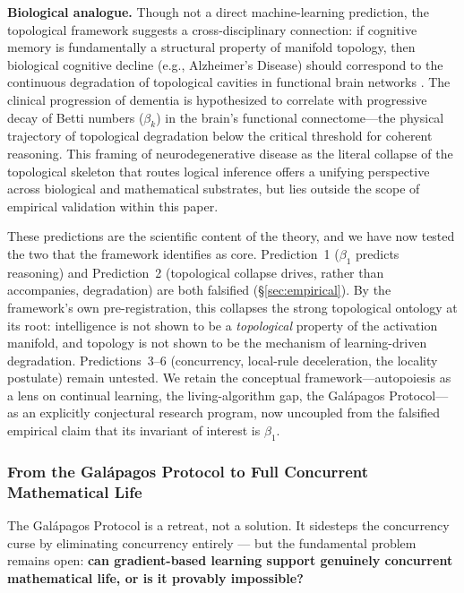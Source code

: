 \documentclass{article}
\begin{document}
\medskip
\noindent\textbf{Biological analogue.} Though not a direct machine-learning prediction, the topological framework suggests a cross-disciplinary connection: if cognitive memory is fundamentally a structural property of manifold topology, then biological cognitive decline (e.g., Alzheimer's Disease) should correspond to the continuous degradation of topological cavities in functional brain networks \citep{Petri2014homological,Sizemore2018cliques,Zhang2026alzheimer,He2025brain}. The clinical progression of dementia is hypothesized to correlate with progressive decay of Betti numbers ($\beta_k$) in the brain's functional connectome---the physical trajectory of topological degradation below the critical threshold for coherent reasoning. This framing of neurodegenerative disease as the literal collapse of the topological skeleton that routes logical inference offers a unifying perspective across biological and mathematical substrates, but lies outside the scope of empirical validation within this paper.

These predictions are the scientific content of the theory, and we have now tested the two that the framework identifies as core. Prediction~1 ($\beta_1$ predicts reasoning) and Prediction~2 (topological collapse drives, rather than accompanies, degradation) are both falsified (\S\ref{sec:empirical}). By the framework's own pre-registration, this collapses the strong topological ontology at its root: intelligence is not shown to be a \emph{topological} property of the activation manifold, and topology is not shown to be the mechanism of learning-driven degradation. Predictions~3--6 (concurrency, local-rule deceleration, the locality postulate) remain untested. We retain the conceptual framework---autopoiesis as a lens on continual learning, the living-algorithm gap, the Gal\'apagos Protocol---as an explicitly conjectural research program, now uncoupled from the falsified empirical claim that its invariant of interest is $\beta_1$.

\subsubsection{From the Galápagos Protocol to Full Concurrent Mathematical Life}
\label{sec:research-agenda}

The Galápagos Protocol is a retreat, not a solution. It sidesteps the concurrency curse by eliminating concurrency entirely --- but the fundamental problem remains open: \textbf{can gradient-based learning support genuinely concurrent mathematical life, or is it provably impossible?}
\end{document}
